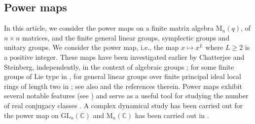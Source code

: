 \documentclass[11pt,twoside]{amsart}
\newcommand{\GL}{\mathrm{GL}}
\newcommand{\M}{\mathrm{M}}
\theoremstyle{definition} %
\begin{document}
\subsection{Power maps}
In this article, we consider the power maps on a finite matrix algebra $\M_n(q)$, of $n\times n$ matrices, and the finite general linear groups, symplectic groups and unitary groups.
We consider the power map, i.e., the map $x\mapsto x^L$ where $L\geq 2$ is a positive integer.
These maps have been investigated earlier by Chatterjee and Steinberg, independently, in the context of algebraic groups \cite{Chatterjee02,Steinberg03}; for some finite groups of Lie type in \cite{KunduSingh2024, PanjaSingh2025,PanjaSingh2024unitary}, for general linear groups over finite principal ideal local rings of length two in \cite{PanjaRoySingh2025}; see also \cite{Panja2025roots} and the references therein. 
Power maps exhibit several notable features (see \cite{Panja2024c}) and serve as a useful tool for studying the number of real conjugacy classes \cite{panja2024d}. 
A complex dynamical study has been carried out for the power map on $\GL_n(\mathbb C)$ and $\M_n(\mathbb C)$ has been carried out in \cite{panja2025dynamics}.
\end{document}
